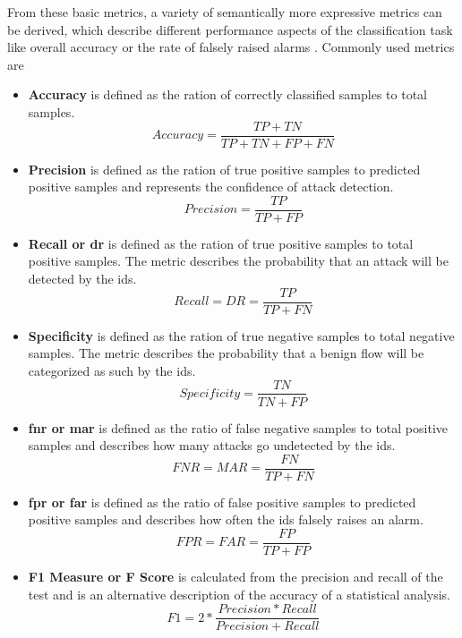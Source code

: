 From these basic metrics, a variety of semantically more expressive metrics can be derived, which describe different performance aspects of the classification task like overall accuracy or the rate of falsely raised alarms \cite{confusion_matrix}. Commonly used metrics are 

\begin{itemize}
	\item \textbf{Accuracy} is defined as the ration of correctly classified samples to total samples. \begin{equation}
	Accuracy = \frac{TP + TN}{TP + TN + FP + FN}
	\end{equation}
	
	\item \textbf{Precision} is defined as the ration of true positive samples to predicted positive samples and represents the confidence of attack detection.
	 \begin{equation}
	Precision = \frac{TP}{TP + FP}
	\end{equation}
	
	\item \textbf{Recall or \gls{dr}} is defined as the ration of true positive samples to total positive samples. The metric describes the probability that an attack will be detected by the \gls{ids}.
	\begin{equation}
	Recall = DR = \frac{TP}{TP + FN}
	\end{equation}
	
	\item \textbf{Specificity} is defined as the ration of true negative samples to total negative samples. The metric describes the probability that a benign flow will be categorized as such by the \gls{ids}.
	\begin{equation}
	Specificity = \frac{TN}{TN + FP}
	\end{equation}
	
	\item \textbf{\gls{fnr} or \gls{mar}} is defined as the ratio of false negative samples to total positive samples and describes how many attacks go undetected by the \gls{ids}.
	\begin{equation}
	FNR = MAR = \frac{FN}{TP + FN}
	\end{equation}
	
	\item \textbf{\gls{fpr} or \gls{far}} is defined as the ratio of false positive samples to predicted positive samples and describes how often the \gls{ids} falsely raises an alarm.
	\begin{equation}
	FPR = FAR = \frac{FP}{TP + FP}
	\end{equation}
	
	\item \textbf{F1 Measure or F Score} is calculated from the precision and recall of the test and is an alternative description of the accuracy of a statistical analysis.
	\begin{equation}
	F1 = 2*\frac{Precision * Recall}{Precision + Recall}
	\end{equation}
\end{itemize}

